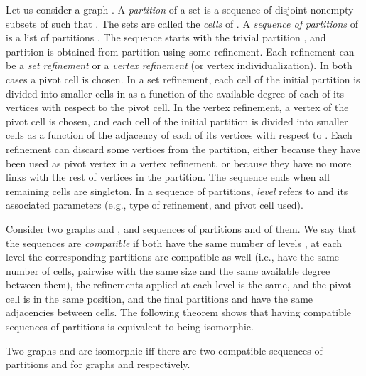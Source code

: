 Let us consider a graph .
A \emph{partition} of a set  is a sequence  of disjoint
nonempty subsets of  such that .  The sets  are called
the \emph{cells} of .
A \emph{sequence of partitions} of  is a list of partitions . The sequence
starts with the trivial partition , and partition  is obtained
from partition  using some refinement. Each refinement can be a \emph{set refinement} or a \emph{vertex refinement} (or vertex individualization).
In both cases a pivot cell is chosen. In a set refinement, each cell of the initial partition  is divided into smaller cells in  as a function of the
available degree of each of its vertices with respect to the pivot cell. In the vertex refinement, a vertex  of the pivot cell is chosen, and each
cell of the initial partition is divided into smaller cells as a function of the
adjacency of each of its vertices with respect to .
Each refinement can discard some vertices from the partition, either because they have been used as pivot
vertex in a vertex refinement, or because they have no more links with the rest of vertices in the partition.
The sequence ends when all remaining cells are singleton.
In a sequence of partitions, \emph{level}  refers to  and its associated
parameters (e.g., type of refinement, and pivot cell used).



















Consider two graphs  and , and sequences of partitions  and  of them.
We say that the sequences are \emph{compatible} if both have the same number of levels , at each level the corresponding partitions are compatible as well (i.e., have the same number of cells, pairwise with the same size and the same available degree between them), the refinements applied at each level  is the same, and the pivot cell is in the same position, and the
final partitions  and  have the same adjacencies between cells.
The following theorem shows that having compatible sequences of partitions is equivalent to being isomorphic.

\begin{theorem}
\label{iso-iif-seq}
Two graphs  and  are isomorphic iff there are two compatible sequences of partitions  and  for graphs  and  respectively.
\end{theorem}

